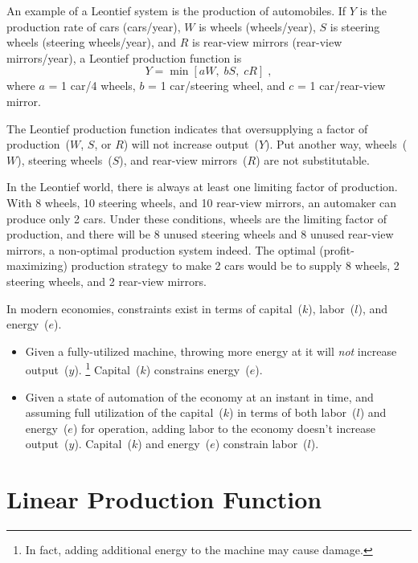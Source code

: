 \documentclass[preprint,authoryear,12pt]{elsarticle}
\begin{document}
An example of a Leontief system is the production of automobiles.
If $Y$ is the production rate of cars (cars/year),
$W$ is wheels (wheels/year), 
$S$ is steering wheels (steering wheels/year), and
$R$ is rear-view mirrors (rear-view mirrors/year), 
a Leontief production function is
%
\begin{equation} \label{eq:cars}
  Y = \min \left[ a W, \; b S, \; c R\right] \; ,
\end{equation}
%
where $a$ = 1 car/4 wheels, $b$ = 1 car/steering wheel, and $c$ = 1 car/rear-view mirror.

The Leontief production function indicates that 
oversupplying a factor of production~($W$, $S$, or $R$) will not increase output~($Y$).
Put another way, wheels~($W$), steering wheels~($S$), and rear-view mirrors~($R$)
are not substitutable. 

In the Leontief world, there is always at least one limiting factor of production.
With 8 wheels, 10 steering wheels, and 10 rear-view mirrors,
an automaker can produce only 2 cars.
Under these conditions, wheels are the limiting factor of production, 
and there will be 8 unused steering wheels and 8 unused rear-view mirrors, 
a non-optimal production system indeed.
The optimal (profit-maximizing) production strategy to make 2 cars would be to supply
8 wheels, 2 steering wheels, and 2 rear-view mirrors.

In modern economies, 
constraints exist in terms of capital~($k$), labor~($l$), and energy~($e$).~\citep{Kummel:2010vz}
%
\begin{itemize}

  \item Given a fully-utilized machine, throwing more energy at it will \emph{not} increase output~($y$).%
  \footnote{
  In fact, adding additional energy to the machine may cause damage.
  }
  Capital~($k$) constrains energy~($e$).
  
  \item Given a state of automation of the economy at an instant in time, 
  and assuming full utilization of the capital~($k$)
  in terms of both labor~($l$) and energy~($e$) for operation,
  adding labor to the economy doesn't increase output~($y$). 
  Capital~($k$) and energy~($e$) constrain labor~($l$).

\end{itemize}


\section{Linear Production Function} 
\label{sec:linear}
\end{document}
